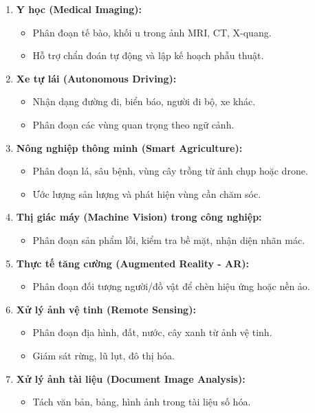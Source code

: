 \documentclass[12pt]{article}
\begin{document}
	\begin{enumerate}[label=\textbf{\arabic*.}]
	\item \textbf{Y học (Medical Imaging):}
	\begin{itemize}
	\item Phân đoạn tế bào, khối u trong ảnh MRI, CT, X-quang.
	\item Hỗ trợ chẩn đoán tự động và lập kế hoạch phẫu thuật.
	\end{itemize}
	
	\item \textbf{Xe tự lái (Autonomous Driving):}
	\begin{itemize}
	\item Nhận dạng đường đi, biển báo, người đi bộ, xe khác.
	\item Phân đoạn các vùng quan trọng theo ngữ cảnh.
	\end{itemize}
	
	\item \textbf{Nông nghiệp thông minh (Smart Agriculture):}
	\begin{itemize}
	\item Phân đoạn lá, sâu bệnh, vùng cây trồng từ ảnh chụp hoặc drone.
	\item Ước lượng sản lượng và phát hiện vùng cần chăm sóc.
	\end{itemize}
	
	\item \textbf{Thị giác máy (Machine Vision) trong công nghiệp:}
	\begin{itemize}
	\item Phân đoạn sản phẩm lỗi, kiểm tra bề mặt, nhận diện nhãn mác.
	\end{itemize}
	
	\item \textbf{Thực tế tăng cường (Augmented Reality - AR):}
	\begin{itemize}
	\item Phân đoạn đối tượng người/đồ vật để chèn hiệu ứng hoặc nền ảo.
	\end{itemize}
	
	\item \textbf{Xử lý ảnh vệ tinh (Remote Sensing):}
	\begin{itemize}
	\item Phân đoạn địa hình, đất, nước, cây xanh từ ảnh vệ tinh.
	\item Giám sát rừng, lũ lụt, đô thị hóa.
	\end{itemize}
	
	\item \textbf{Xử lý ảnh tài liệu (Document Image Analysis):}
	\begin{itemize}
	\item Tách văn bản, bảng, hình ảnh trong tài liệu số hóa.
	\end{itemize}
	
	\end{enumerate}
	
\end{document}
